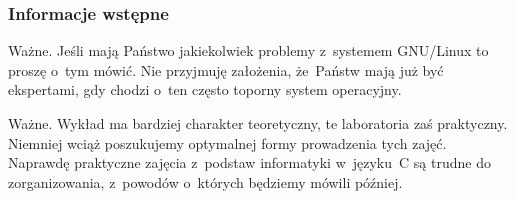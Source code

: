 \documentclass[10pt,t]{beamer}
\begin{document}
\begin{frame}
  \frametitle{Informacje wstępne}







  \alert{Ważne.} Jeśli mają Państwo jakiekolwiek problemy z~systemem
  GNU/Linux to proszę o~tym \alert{mówić}. Nie przyjmuję założenia,
  że~Państw mają już być ekspertami, gdy chodzi o~ten często toporny system
  operacyjny.

  \alert{Ważne.} Wykład ma bardziej charakter teoretyczny, te laboratoria
  zaś praktyczny. Niemniej wciąż poszukujemy optymalnej formy prowadzenia
  tych zajęć. Naprawdę praktyczne zajęcia z~podstaw informatyki w~języku~C
  są trudne do zorganizowania, z~powodów o~których będziemy mówili
  później.

\end{frame}
\end{document}

